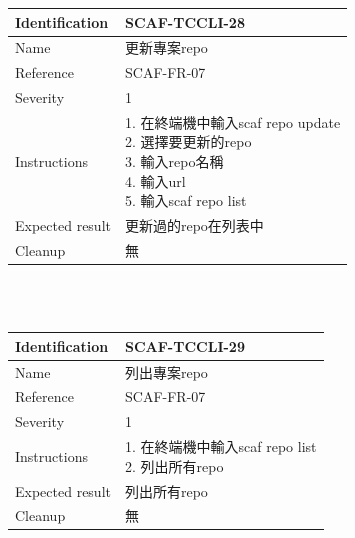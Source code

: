 \documentclass{report}
\begin{document}
\begin{tabularx}{\textwidth}{
  |p{}%
  |p{}|%
  }
  \hline
  \centering Identification &  SCAF-TCCLI-28 \\
  \hline
  \centering Name & 更新專案repo \\
  \hline
  \centering Reference & SCAF-FR-07 \\
  \hline
  \centering Severity & 1 \\
  \hline
  \centering Instructions & 
  \makecell[l]{
    1. 在終端機中輸入scaf repo update \\
    2. 選擇要更新的repo \\
    3. 輸入repo名稱 \\
    4. 輸入url \\
    5. 輸入scaf repo list \\
  }\\
  \hline
  \centering Expected result & 更新過的repo在列表中 \\
  \hline
  \centering Cleanup & 無 \\
  \hline
\end{tabularx}
\\
\newline
\\

\begin{tabularx}{\textwidth}{
  |p{}%
  |p{}|%
  }
  \hline
  \centering Identification &  SCAF-TCCLI-29 \\
  \hline
  \centering Name & 列出專案repo \\
  \hline
  \centering Reference & SCAF-FR-07 \\
  \hline
  \centering Severity & 1 \\
  \hline
  \centering Instructions & 
  \makecell[l]{
    1. 在終端機中輸入scaf repo list \\
    2. 列出所有repo \\
  }\\
  \hline
  \centering Expected result & 列出所有repo \\
  \hline
  \centering Cleanup & 無 \\
  \hline
\end{tabularx}
\\
\newline
\\
\end{document}

